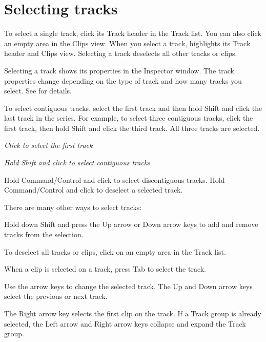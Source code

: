\chapter{Selecting tracks}
\hypertarget{md__hey_tea_9_2_library_2_package_cache_2com_8unity_8timeline_0d1_87_85_2_documentation_0i_2trk__select}{}\label{md__hey_tea_9_2_library_2_package_cache_2com_8unity_8timeline_0d1_87_85_2_documentation_0i_2trk__select}
\label{md__hey_tea_9_2_library_2_package_cache_2com_8unity_8timeline_0d1_87_85_2_documentation_0i_2trk__select_autotoc_md4763}%
%
 To select a single track, click its Track header in the Track list. You can also click an empty area in the Clips view. When you select a track,  highlights its Track header and Clips view. Selecting a track deselects all other tracks or clips.

Selecting a track shows its properties in the Inspector window. The track properties change depending on the type of track and how many tracks you select. See  for details.

To select contiguous tracks, select the first track and then hold Shift and click the last track in the series. For example, to select three contiguous tracks, click the first track, then hold Shift and click the third track. All three tracks are selected.



{\itshape Click to select the first track}



{\itshape Hold Shift and click to select contiguous tracks}

Hold Command/\+Control and click to select discontiguous tracks. Hold Command/\+Control and click to deselect a selected track.

There are many other ways to select tracks\+:


\begin{DoxyItemize}
\item Hold down Shift and press the Up arrow or Down arrow keys to add and remove tracks from the selection.
\item To deselect all tracks or clips, click on an empty area in the Track list.
\item When a clip is selected on a track, press Tab to select the track.
\item Use the arrow keys to change the selected track. The Up and Down arrow keys select the previous or next track.
\item The Right arrow key selects the first clip on the track. If a Track group is already selected, the Left arrow and Right arrow keys collapse and expand the Track group. 
\end{DoxyItemize}